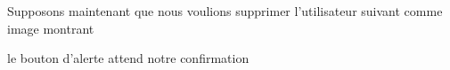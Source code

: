 \documentclass{article}
\begin{document}
\begin{enumerate}
  
   
  \vspace{0.7cm}
               \hspace*{-0.7in}
               \noindent{}
  
  
  
  Supposons maintenant que nous voulions supprimer l'utilisateur suivant comme image montrant
  
  \vspace{0.7cm}
              \hspace*{-0.7in}
               \noindent{}
  
  le bouton d'alerte attend notre confirmation
  
\vspace{0.7cm}
               \hspace*{-0.7in}


\end{enumerate}
\end{document}
